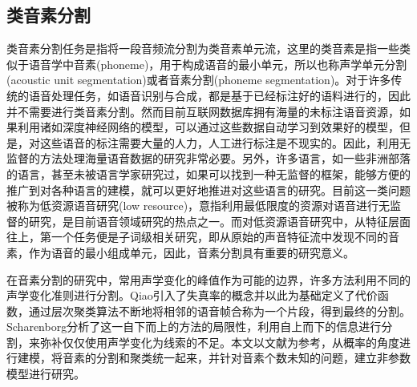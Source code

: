 \subsection{类音素分割}
类音素分割任务是指将一段音频流分割为类音素单元流，这里的类音素是指一些类似于语音学中音素(phoneme)，用于构成语音的最小单元，所以也称声学单元分割(acoustic unit segmentation)或者音素分割(phoneme segmentation)。对于许多传统的语音处理任务，如语音识别与合成，都是基于已经标注好的语料进行的，因此并不需要进行类音素分割。然而目前互联网数据库拥有海量的未标注语音资源，如果利用诸如深度神经网络的模型，可以通过这些数据自动学习到效果好的模型\cite{bengio2009learning}，但是，对这些语音的标注需要大量的人力，人工进行标注是不现实的。因此，利用无监督的方法处理海量语音数据的研究非常必要。另外，许多语言，如一些非洲部落的语言，甚至未被语言学家研究过，如果可以找到一种无监督的框架，能够方便的推广到对各种语言的建模，就可以更好地推进对这些语言的研究。目前这一类问题被称为低资源语音研究(low resource)\cite{park2005towards,glass2012towards}，意指利用最低限度的资源对语音进行无监督的研究，是目前语音领域研究的热点之一。而对低资源语音研究中，从特征层面往上，第一个任务便是子词级相关研究，即从原始的声音特征流中发现不同的音素，作为语音的最小组成单元，因此，音素分割具有重要的研究意义。

在音素分割的研究中，常用声学变化的峰值作为可能的边界，许多方法利用不同的声学变化准则进行分割\cite{aversano2001new,estevan2007finding,dusan2006relation}。Qiao引入了失真率的概念并以此为基础定义了代价函数，通过层次聚类算法不断地将相邻的语音帧合称为一个片段，得到最终的分割\cite{qiao2008unsupervised}。Scharenborg分析了这一自下而上的方法的局限性，利用自上而下的信息进行分割，来弥补仅仅使用声学变化为线索的不足\cite{scharenborg2010unsupervised}。本文以文献\cite{torbati2013speech,lee2012nonparametric}为参考，从概率的角度进行建模，将音素的分割和聚类统一起来，并针对音素个数未知的问题，建立非参数模型进行研究。

